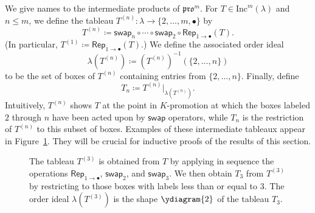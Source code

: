 \documentclass[12pt]{amsart}
\theoremstyle{definition}
\theoremstyle{remark}
\numberwithin{equation}{section}
\newcommand{\inc}{\ensuremath{\mathrm{Inc}}}
\newcommand{\pro}{\mathfrak{pro}}
\newcommand{\swap}{\ensuremath{\mathsf{swap}}}
\newcommand{\rep}{\ensuremath{\mathsf{Rep}}}
\begin{document}
We give names to the intermediate products of $\pro^m$.
For $T \in \inc^m(\lambda)$ and $n \leq m$, we define the tableau $T^{(n)}: \lambda \rightarrow \lbrace 2, \dots, m, \bullet \rbrace$ by 
\[T^{(n)} \coloneqq \swap_n \circ \cdots \circ \swap_2 \circ \rep_{1 \rightarrow \bullet}(T).\] (In particular, $T^{(1)} \coloneqq \rep_{1 \rightarrow \bullet}(T)$.) We define the associated order ideal 
\[
\lambda \left( T^{(n)} \right) \coloneqq \left( T^{(n)} \right)^{-1}(\{2,\dots,n\})
\]
 to be the set of boxes of $T^{(n)}$ containing entries from $\{2,\dots,n\}$. Finally, define 
 \[
 T_n \coloneqq T^{(n)} \vert_{\lambda \left( T^{(n)} \right) }.
 \]
  Intuitively, $T^{(n)}$ shows $T$ at the point in $K$-promotion at which the boxes labeled $2$ through $n$ have been acted upon by $\swap$ operators, while $T_n$ is the restriction of $T^{(n)}$ to this subset of boxes. Examples of these intermediate tableaux appear in Figure~\ref{fig:restricted_promotions}. They will be crucial for inductive proofs of the results of this section. 
  
\begin{figure}[h]
\caption{The tableau $T^{(3)}$ is obtained from $T$ by applying in sequence the operations 
$\rep_{1 \rightarrow \bullet}$, $\swap_2$, and $\swap_3$. 
We then obtain $T_3$ from $T^{(3)}$ by restricting to 
those boxes with labels less than or equal to $3$. The order ideal
 $\lambda \left( T^{(3)} \right)$ is the 
shape $\ydiagram{2}$ of the tableau $T_3$. }\label{fig:restricted_promotions}
\end{figure}
 
\end{document}
